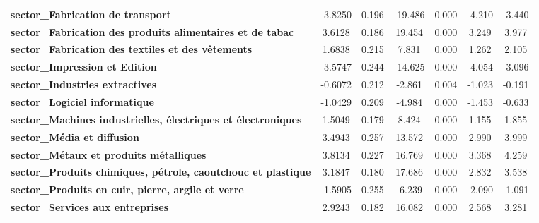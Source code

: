 \begin{center}
\begin{tabular}{lcccccc}
\textbf{sector\_Fabrication de transport}                             &      -3.8250  &        0.196     &   -19.486  &         0.000        &       -4.210    &       -3.440     \\
\textbf{sector\_Fabrication des produits alimentaires et de tabac}    &       3.6128  &        0.186     &    19.454  &         0.000        &        3.249    &        3.977     \\
\textbf{sector\_Fabrication des textiles et des vêtements}            &       1.6838  &        0.215     &     7.831  &         0.000        &        1.262    &        2.105     \\
\textbf{sector\_Impression et Edition}                                &      -3.5747  &        0.244     &   -14.625  &         0.000        &       -4.054    &       -3.096     \\
\textbf{sector\_Industries extractives}                               &      -0.6072  &        0.212     &    -2.861  &         0.004        &       -1.023    &       -0.191     \\
\textbf{sector\_Logiciel informatique}                                &      -1.0429  &        0.209     &    -4.984  &         0.000        &       -1.453    &       -0.633     \\
\textbf{sector\_Machines industrielles, électriques et électroniques} &       1.5049  &        0.179     &     8.424  &         0.000        &        1.155    &        1.855     \\
\textbf{sector\_Média et diffusion}                                   &       3.4943  &        0.257     &    13.572  &         0.000        &        2.990    &        3.999     \\
\textbf{sector\_Métaux et produits métalliques}                       &       3.8134  &        0.227     &    16.769  &         0.000        &        3.368    &        4.259     \\
\textbf{sector\_Produits chimiques, pétrole, caoutchouc et plastique} &       3.1847  &        0.180     &    17.686  &         0.000        &        2.832    &        3.538     \\
\textbf{sector\_Produits en cuir, pierre, argile et verre}            &      -1.5905  &        0.255     &    -6.239  &         0.000        &       -2.090    &       -1.091     \\
\textbf{sector\_Services aux entreprises}                             &       2.9243  &        0.182     &    16.082  &         0.000        &        2.568    &        3.281     \\

\end{tabular}
\end{center}
